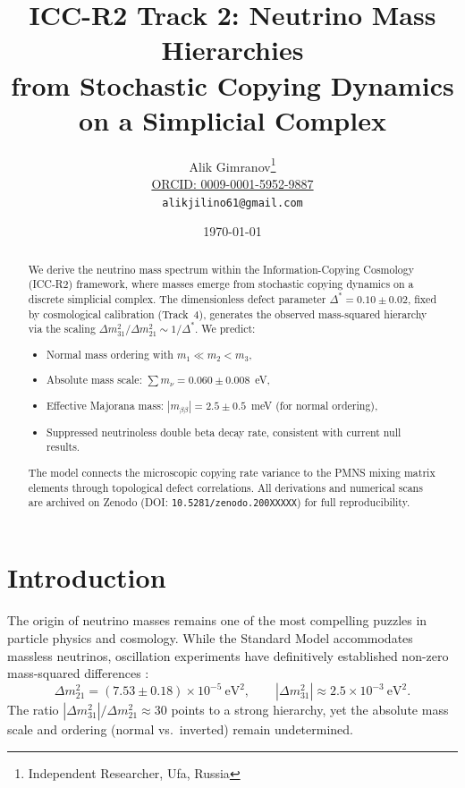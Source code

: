\documentclass[11pt,a4paper]{article}
\title{
    \textbf{ICC-R2 Track 2: Neutrino Mass Hierarchies} \\
    \large from Stochastic Copying Dynamics on a Simplicial Complex
}
\author{
    Alik Gimranov\thanks{Independent Researcher, Ufa, Russia} \\
    \href{https://orcid.org/0009-0001-5952-9887}{ORCID: 0009-0001-5952-9887} \\
    \texttt{alikjilino61@gmail.com}
}
\date{\today}
\newcommand{\DeltaStar}{\Delta^{\ast}}
\newcommand{\zenodoDOITrackTwo}{10.5281/zenodo.200XXXXX} %
\begin{document}
\maketitle

\begin{abstract}
\noindent
We derive the neutrino mass spectrum within the Information-Copying Cosmology (ICC-R2) framework, where masses emerge from stochastic copying dynamics on a discrete simplicial complex. The dimensionless defect parameter $\DeltaStar = 0.10 \pm 0.02$, fixed by cosmological calibration (Track~4), generates the observed mass-squared hierarchy via the scaling $\Delta m^2_{31}/\Delta m^2_{21} \sim 1/\DeltaStar$. We predict:
\begin{itemize}
    \item Normal mass ordering with $m_1 \ll m_2 < m_3$,
    \item Absolute mass scale: $\sum m_\nu = 0.060 \pm 0.008$~eV,
    \item Effective Majorana mass: $|m_{\beta\beta}| = 2.5 \pm 0.5$~meV (for normal ordering),
    \item Suppressed neutrinoless double beta decay rate, consistent with current null results.
\end{itemize}
The model connects the microscopic copying rate variance to the PMNS mixing matrix elements through topological defect correlations. All derivations and numerical scans are archived on Zenodo (DOI: \texttt{\zenodoDOITrackTwo}) for full reproducibility.
\end{abstract}

\section{Introduction}
\label{sec:intro}

The origin of neutrino masses remains one of the most compelling puzzles in particle physics and cosmology. While the Standard Model accommodates massless neutrinos, oscillation experiments have definitively established non-zero mass-squared differences \cite{nufit2024}:
\begin{equation}
\Delta m^2_{21} = (7.53 \pm 0.18) \times 10^{-5}~\text{eV}^2, \qquad
|\Delta m^2_{31}| \approx 2.5 \times 10^{-3}~\text{eV}^2.
\end{equation}
The ratio $|\Delta m^2_{31}|/\Delta m^2_{21} \approx 30$ points to a strong hierarchy, yet the absolute mass scale and ordering (normal vs.\ inverted) remain undetermined.
\end{document}
